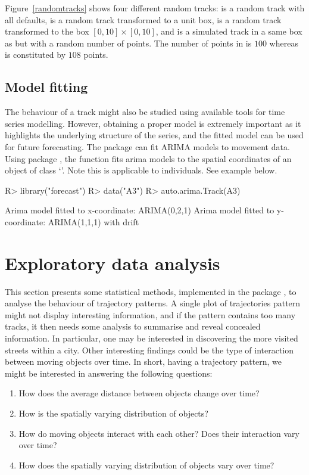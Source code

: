 \documentclass[article]{jss}
\newcommand{\class}[1]{`\code{#1}'}
\begin{document}
Figure~\ref{randomtracks} shows four different random tracks:  is a random track with all defaults,  is a random track transformed to a unit box,  is a random track transformed to the box $[0,10]\times [0,10]$, and  is a simulated track in a same box as  but with a random number of points. The number of points in  is $100$ whereas  is constituted by $108$ points.


 \subsection{Model fitting}
  The behaviour of a track might also be studied using available tools for time series modelling. However, obtaining a proper model is extremely important as it highlights the
  underlying structure of the series, and the fitted model can be used for future forecasting. The  package
   can fit ARIMA models to movement data. Using  package , the function  fits arima models to the spatial coordinates of an object of class \class{Track}. Note this is applicable to individuals. See example below.

\begin{Sinput}
R> library("forecast")
R> data("A3")
R> auto.arima.Track(A3)
\end{Sinput}
\begin{Soutput}
Arima model fitted to x-coordinate: ARIMA(0,2,1) 
Arima model fitted to y-coordinate: ARIMA(1,1,1) with drift
\end{Soutput}

\section{Exploratory data analysis} \label{sec:explo}
  This section presents some statistical methods, implemented in the  package , to analyse the behaviour of trajectory patterns. A single plot of trajectories pattern might not display interesting information, and if the pattern contains too many tracks, it then needs some analysis to summarise and reveal concealed information. In particular, one may be interested in discovering the more visited streets within a city. Other interesting findings could be the type of interaction between moving objects over time. In short, having a trajectory pattern, we might be interested in answering the following questions:
  \begin{enumerate}
  \item How does the average distance between objects change over time?
  \item How is the spatially varying distribution of objects?
  \item How do moving objects interact with each other? Does their interaction vary over time?
  \item How does the spatially varying distribution of objects vary over time?
  \end{enumerate}
\end{document}
